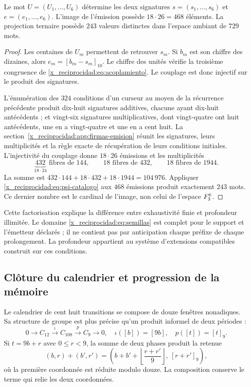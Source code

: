 \begin{proposition}
Le mot \(U=(U_1,\ldots,U_6)\) détermine les deux signatures \(s=(s_1,\ldots,s_6)\) et \(e=(e_1,\ldots,e_6)\). L’image de l’émission possède \(18\cdot26=468\) éléments. La projection ternaire possède \(243\) valeurs distinctes dans l’espace ambiant de \(729\) mots.
\end{proposition}
\begin{proof}
Les centaines de \(U_m\) permettent de retrouver \(s_m\). Si \(b_m\) est son chiffre des dizaines, alors \(e_m=[b_m-s_m]_{10}\). Le chiffre des unités vérifie la troisième congruence de \eqref{x_reciprocidad:eq:acoplamiento}. Le couplage est donc injectif sur le produit des signatures.

L'énumération des \(324\) conditions d'un curseur au moyen de la récurrence précédente produit dix-huit signatures additives, chacune ayant dix-huit antécédents ; et vingt-six signatures multiplicatives, dont vingt-quatre ont huit antécédents, une en a vingt-quatre et une en a cent huit. La section~\ref{x_reciprocidad:app:firmas-emision} réunit les signatures, leurs multiplicités et la règle exacte de récupération de leurs conditions initiales. L'injectivité du couplage donne \(18\cdot26\) émissions et les multiplicités
\[
 \underbrace{432}_{18\cdot24}\text{ fibres de }144,
 \qquad18\text{ fibres de }432,
 \qquad18\text{ fibres de }1944.
\]
La somme est \(432\cdot144+18\cdot432+18\cdot1944=104\,976\). Appliquer \eqref{x_reciprocidad:eq:psi-catalogo} aux \(468\) émissions produit exactement \(243\) mots. Ce dernier nombre est le cardinal de l’image, non celui de l’espace \(F_3^6\).
\end{proof}

Cette factorisation explique la différence entre exhaustivité finie et profondeur illimitée. Le domaine \eqref{x_reciprocidad:eq:semillas} est complet pour le support et l’émetteur déclarés ; il ne contient pas par anticipation chaque préfixe de chaque prolongement. La profondeur appartient au système d’extensions compatibles construit sur ces conditions.

\subsection{Clôture du calendrier et progression de la mémoire}

Le calendrier de cent huit transitions se compose de douze fenêtres nonadiques. Sa structure de groupe est plus précise qu’un produit informel de deux périodes :
\begin{equation}
 0\longrightarrow C_{12}\xrightarrow{\iota}C_{108}
 \xrightarrow{p}C_9\longrightarrow0,
 \quad\iota([b])=[9b],\quad p([t])=[t]_9.
 \label{x_reciprocidad:eq:extension108}
\end{equation}
Si \(t=9b+r\) avec \(0\le r<9\), la somme de deux phases produit la retenue
\[
 (b,r)+(b',r')=
 \left(b+b'+\left\lfloor\frac{r+r'}9\right\rfloor,\ [r+r']_9\right),
\]
où la première coordonnée est réduite modulo douze. La composition conserve le terme qui relie les deux coordonnées.

